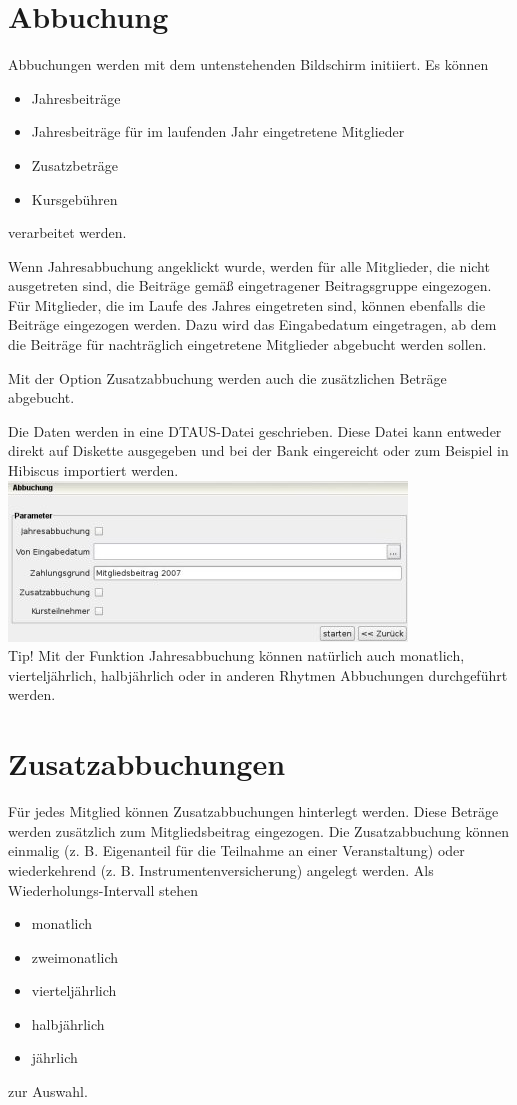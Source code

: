 \documentclass[a4paper,BCOR30mm,DIV14,pdftex,liststotoc,footsepline,openany]{scrbook}
\begin{document}
\chapter{Abbuchung}
Abbuchungen werden mit dem untenstehenden Bildschirm initiiert. Es können
\begin{itemize}
 \item Jahresbeiträge 
 \item Jahresbeiträge für im laufenden Jahr eingetretene Mitglieder
 \item Zusatzbeträge
 \item Kursgebühren
\end{itemize}
verarbeitet werden.

Wenn Jahresabbuchung angeklickt wurde, werden für alle Mitglieder, die nicht ausgetreten sind, die Beiträge gemäß eingetragener Beitragsgruppe eingezogen. Für Mitglieder, die im Laufe des Jahres eingetreten sind, können ebenfalls die Beiträge eingezogen werden. Dazu wird das Eingabedatum eingetragen, ab dem die Beiträge für nachträglich eingetretene Mitglieder abgebucht werden sollen.

Mit der Option Zusatzabbuchung werden auch die zusätzlichen Beträge abgebucht.

Die Daten werden in eine DTAUS-Datei geschrieben. Diese Datei kann entweder direkt auf Diskette ausgegeben und bei der Bank eingereicht oder zum Beispiel in Hibiscus importiert werden.\\
\includegraphics{./screenshots/abbuchung.jpg}\\
Tip! Mit der Funktion Jahresabbuchung können natürlich auch monatlich, vierteljährlich, halbjährlich oder in anderen
Rhytmen Abbuchungen durchgeführt werden.


\chapter{Zusatzabbuchungen}
Für jedes Mitglied können Zusatzabbuchungen hinterlegt werden. Diese Beträge werden zusätzlich zum Mitgliedsbeitrag eingezogen. Die Zusatzabbuchung können einmalig (z. B. Eigenanteil für die Teilnahme an einer Veranstaltung) oder wiederkehrend (z. B. Instrumentenversicherung) angelegt werden. Als Wiederholungs-Intervall stehen
\begin{itemize}
 \item monatlich
 \item zweimonatlich
 \item vierteljährlich
 \item halbjährlich
 \item jährlich
\end{itemize}
zur Auswahl.
\end{document}
